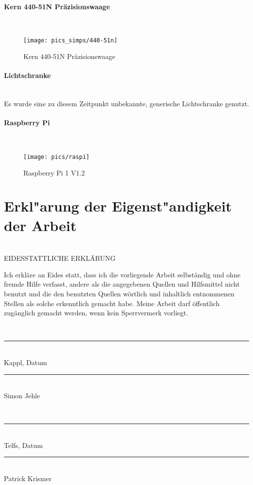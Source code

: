 \documentclass[12pt,a4paper]{article}
\begin{document}
\paragraph{Kern 440-51N Präzisionswaage}\mbox{}\\
\begin{figure}[h!]
	\centering
	\texttt{[image: pics\_simps/440-51n]}
	\caption{Kern 440-51N Präzisionswaage}
\end{figure}
%
\paragraph{Lichtschranke}\mbox{}\\
Es wurde eine zu diesem Zeitpunkt unbekannte, generische Lichtschranke genutzt.
%
\paragraph{Raspberry Pi}\mbox{}\\
\begin{figure}[h!]
	\centering
	\texttt{[image: pics/raspi]}
	\caption{Raspberry Pi 1 V1.2}
\end{figure}
%
%
\clearpage\vfill\newpage{}
\section{Erkl"arung der Eigenst"andigkeit der Arbeit}
	\noindent\\[0mm] EIDESSTATTLICHE ERKLÄRUNG
	\\[4mm]
	\parbox{152mm}{
	Ich erkläre an Eides statt, dass ich die vorliegende Arbeit selbständig und ohne
	fremde Hilfe verfasst, andere als die angegebenen Quellen und Hilfsmittel nicht
	benutzt und die den benutzten Quellen wörtlich und inhaltlich entnommenen
	Stellen als solche erkenntlich gemacht habe. Meine Arbeit darf öffentlich
	zugänglich gemacht werden, wenn kein Sperrvermerk vorliegt.
	}
	\\[19mm]\parbox{80mm}{
		\rule{60mm}{.5pt}\\
		\hspace*{3mm}Kappl, Datum
	}
	\parbox{80mm}{
		\rule{70mm}{.5pt}\\
		\hspace*{3mm}Simon Jehle
	}
		\\[19mm]\parbox{80mm}{
		\rule{60mm}{.5pt}\\
		\hspace*{3mm}Telfs, Datum
	}
	\parbox{80mm}{
		\rule{70mm}{.5pt}\\
		\hspace*{3mm}Patrick Krismer
	}
\end{document}
